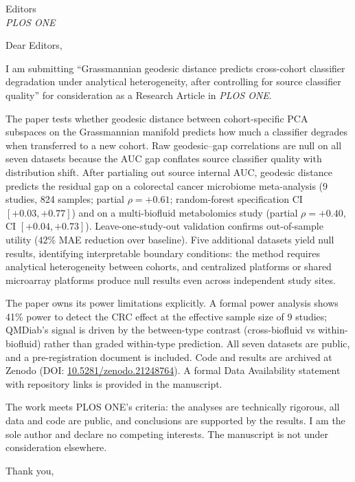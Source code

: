 \documentclass[11pt]{letter}
\date{July 7, 2026}
\begin{document}
\begin{letter}{Editors \\ \textit{PLOS ONE}}

\opening{Dear Editors,}

I am submitting ``Grassmannian geodesic distance predicts cross-cohort classifier degradation under analytical heterogeneity, after controlling for source classifier quality'' for consideration as a Research Article in \textit{PLOS ONE}.

The paper tests whether geodesic distance between cohort-specific PCA subspaces on the Grassmannian manifold predicts how much a classifier degrades when transferred to a new cohort. Raw geodesic--gap correlations are null on all seven datasets because the AUC gap conflates source classifier quality with distribution shift. After partialing out source internal AUC, geodesic distance predicts the residual gap on a colorectal cancer microbiome meta-analysis (9 studies, 824 samples; partial $\rho = +0.61$; random-forest specification CI $[+0.03, +0.77]$) and on a multi-biofluid metabolomics study (partial $\rho = +0.40$, CI $[+0.04, +0.73]$). Leave-one-study-out validation confirms out-of-sample utility (42\% MAE reduction over baseline). Five additional datasets yield null results, identifying interpretable boundary conditions: the method requires analytical heterogeneity between cohorts, and centralized platforms or shared microarray platforms produce null results even across independent study sites.

The paper owns its power limitations explicitly. A formal power analysis shows 41\% power to detect the CRC effect at the effective sample size of 9 studies; QMDiab's signal is driven by the between-type contrast (cross-biofluid vs within-biofluid) rather than graded within-type prediction. All seven datasets are public, and a pre-registration document is included. Code and results are archived at Zenodo (DOI: \href{https://doi.org/10.5281/zenodo.21248764}{10.5281/zenodo.21248764}). A formal Data Availability statement with repository links is provided in the manuscript.

The work meets PLOS ONE's criteria: the analyses are technically rigorous, all data and code are public, and conclusions are supported by the results. I am the sole author and declare no competing interests. The manuscript is not under consideration elsewhere.

\closing{Thank you,}

\end{letter}
\end{document}
